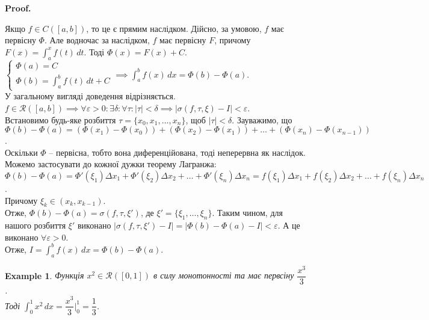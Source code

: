 \documentclass[a4paper, 10pt]{article}
\makeatletter
\def\huge{\displaystyle}
\def\qed{$\blacksquare$}
\theoremstyle{theoremdd}
\theoremstyle{theoremdd}
\theoremstyle{theoremdd}
\theoremstyle{theoremdd}
\theoremstyle{theoremdd}
\newtheorem{example}[theorem]{Example}
\theoremstyle{theoremdd}
\theoremstyle{theoremdd}
\theoremstyle{theoremdd}
\theoremstyle{theoremdd}
\renewenvironment{proof}[1][Proof.\\]{\par
\pushQED{\hfill \qed}%
\normalfont \topsep6\p@\@plus6\p@\relax
\trivlist
\item\relax
{\bfseries
#1\@addpunct{.}}\hspace\labelsep\ignorespaces
}{%
\popQED\endtrivlist\@endpefalse
}
\makeatother
\begin{document}
\begin{proof}
Якщо $f \in C([a,b])$, то це є прямим наслідком. Дійсно, за умовою, $f$ має первісну $\Phi$. Але водночас за наслідком, $f$ має первісну $F$, причому $F(x) = \huge\int_a^x f(t)\,dt$. Тоді $\Phi(x) = F(x) + C$.\\
$\begin{cases}
\Phi(a) = C \\
\Phi(b) = \huge\int_a^b f(t)\,dt + C
\end{cases} \implies \huge\int_a^b f(x)\,dx = \Phi(b) - \Phi(a)$.
\bigskip \\
У загальному вигляді доведення відрізняється. \\
$f \in \mathcal{R}([a,b]) \implies \forall \varepsilon > 0: \exists \delta: \forall \tau: |\tau| < \delta \implies |\sigma(f, \tau, \xi)-I|<\varepsilon$.\\
Встановимо будь-яке розбиття $\tau = \{x_0,x_1,\dots,x_n\}$, щоб $|\tau| < \delta$. Зауважимо, що\\
$\Phi(b) - \Phi(a) = (\Phi(x_1)-\Phi(x_0)) + (\Phi(x_2)-\Phi(x_1)) + \dots + (\Phi(x_n)-\Phi(x_{n-1}))$.\\
Оскільки $\Phi$ -- первісна, тобто вона диференційована, тоді неперервна як наслідок. Можемо застосувати до кожної дужки теорему Лагранжа:\\
$\Phi(b) - \Phi(a) = \Phi'(\xi_1) \Delta x_1 + \Phi'(\xi_2) \Delta x_2 + \dots + \Phi'(\xi_n)\Delta x_n = f(\xi_1)\Delta x_1 + f(\xi_2)\Delta x_2 + \dots + f(\xi_n)\Delta x_n$.\\
Причому $\xi_k \in (x_k,x_{k-1})$.\\
Отже, $\Phi(b) - \Phi(a) = \sigma(f,\tau,\xi')$, де $\xi' = \{\xi_1,\dots,\xi_n\}$. Таким чином, для нашого розбиття $\xi'$ виконано $|\sigma(f,\tau,\xi') - I| = |\Phi(b) - \Phi(a) - I| <\varepsilon$. А це виконано $\forall \varepsilon > 0$.\\
Отже, $I = \huge\int_a^b f(x)\,dx = \Phi(b) - \Phi(a)$.
\end{proof}

\begin{example}
Функція $x^2 \in \mathcal{R}([0,1])$ в силу монотонності та має первсіну $\dfrac{x^3}{3}$. \\ Тоді $\huge\int_0^1 x^2\,dx = \dfrac{x^3}{3} \Big|_0^1 = \dfrac{1}{3}$.
\end{example}
\end{document}
